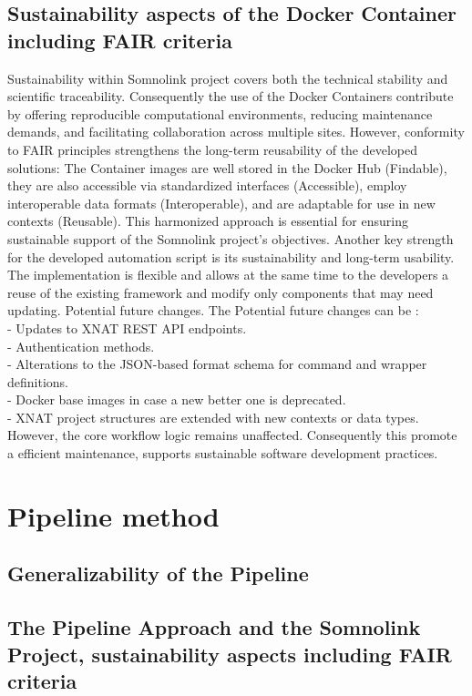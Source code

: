 \subsection{Sustainability aspects of the Docker Container including FAIR criteria}
Sustainability within Somnolink project covers both the technical stability and scientific traceability. Consequently the use of the Docker Containers contribute by offering reproducible computational environments, reducing maintenance demands, and facilitating collaboration across multiple sites. However, conformity to FAIR principles strengthens the long-term reusability of the developed solutions: The Container images are well stored in the Docker Hub (Findable), they are also accessible via standardized interfaces (Accessible), employ interoperable data formats (Interoperable), and are adaptable for use in new contexts (Reusable). This harmonized approach is essential for ensuring sustainable support of the Somnolink project’s objectives. 
Another key strength for the developed automation script is its sustainability and long-term usability. The implementation is flexible and allows at the same time to the developers a reuse of the existing framework and modify only components that may need updating. Potential future changes. The Potential future changes can be :\\
- Updates to XNAT REST API endpoints.\\
- Authentication methods.\\
-  Alterations to the JSON-based format schema for command and wrapper definitions.\\
-  Docker base images in case a new better one is deprecated.\\
- XNAT project structures are extended with new contexts or data types.\\
However, the core workflow logic remains unaffected. Consequently this promote a efficient maintenance, supports sustainable software development practices.

\section{Pipeline method}
\subsection{Generalizability of the Pipeline}
\subsection{The Pipeline Approach and the Somnolink Project, sustainability aspects including FAIR criteria}
